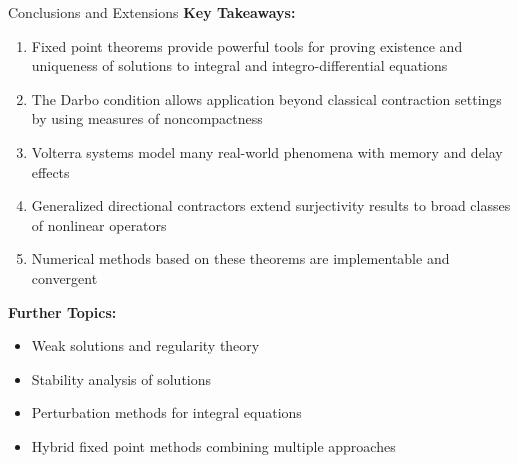 \documentclass[aspectratio=169,10pt]{beamer}
\begin{document}
\begin{frame}[allowframebreaks]{Conclusions and Extensions}{}
\textbf{Key Takeaways:}
\begin{enumerate}
    \item Fixed point theorems provide powerful tools for proving existence and uniqueness of solutions to integral and integro-differential equations

    \item The Darbo condition allows application beyond classical contraction settings by using measures of noncompactness

    \item Volterra systems model many real-world phenomena with memory and delay effects

    \item Generalized directional contractors extend surjectivity results to broad classes of nonlinear operators

    \item Numerical methods based on these theorems are implementable and convergent
\end{enumerate}

\medskip
\textbf{Further Topics:}
\begin{itemize}
    \item Weak solutions and regularity theory
    \item Stability analysis of solutions
    \item Perturbation methods for integral equations
    \item Hybrid fixed point methods combining multiple approaches
\end{itemize}
\end{frame}
\end{document}
